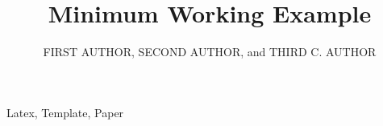 \documentclass{ieeeaccess}
\begin{document}
\renewcommand{\thevol}{0}
\renewcommand{\theyear}{2023}

\title{Minimum Working Example}
\author{
	\uppercase{First Author},
	\uppercase{Second Author}, and 
	\uppercase{Third C. Author}}

	
\address[1]{Affiliation name, City, Country}
\address[2]{Affiliation name, City, Country}
\address[3]{Affiliation name, City, Country}





\begin{abstract}
\lipsum[1]
\end{abstract}

\begin{keywords}
Latex, Template, Paper
\end{keywords}

\titlepgskip=-15pt

\maketitle



\EOD
\end{document}
